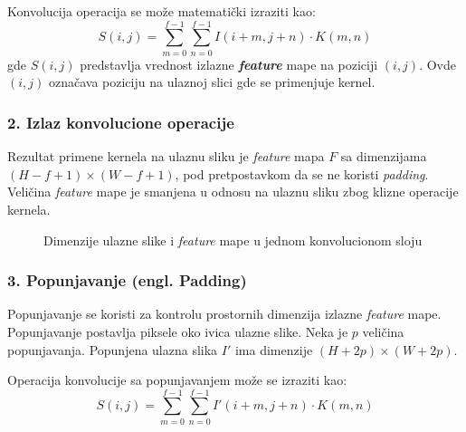 \documentclass[12pt]{article}
\begin{document}
   Konvolucija operacija se može matematički izraziti kao:
   \[
   S(i, j) = \sum_{m=0}^{f-1} \sum_{n=0}^{f-1} I(i+m, j+n) \cdot K(m, n)
   \]
   gde \( S(i, j) \) predstavlja vrednost izlazne \textbf{\textit{feature}} mape na poziciji 
   \((i, j)\). Ovde \( (i, j) \) označava poziciju na ulaznoj slici gde se primenjuje kernel.

   \subsubsection*{2. Izlaz konvolucione operacije}
   Rezultat primene kernela na ulaznu sliku je \textit{feature} mapa \( F \) 
   sa dimenzijama \((H - f + 1) \times (W - f + 1)\), pod pretpostavkom da se ne 
   koristi \textit{padding}. Veličina \textit{feature} mape je 
   smanjena u odnosu na ulaznu sliku zbog klizne operacije kernela.

   \newpage   

   \begin{figure}[h!]
      \centering
      \caption{Dimenzije ulazne slike i \textit{feature} mape u jednom konvolucionom sloju}
      \label{fig:convolution}
    \end{figure}

    \subsubsection*{3. Popunjavanje (engl. Padding)}

    Popunjavanje se koristi za kontrolu prostornih dimenzija izlazne \textit{feature} mape. 
    Popunjavanje postavlja piksele oko ivica ulazne slike. 
    Neka je \( p \) veličina popunjavanja. 
    Popunjena ulazna slika \( I' \) ima dimenzije \((H + 2p) \times (W + 2p)\).
    
    Operacija konvolucije sa popunjavanjem može se izraziti kao:
    \[
    S(i, j) = \sum_{m=0}^{f-1} \sum_{n=0}^{f-1} I'(i+m, j+n) \cdot K(m, n)
    \]
\end{document}

